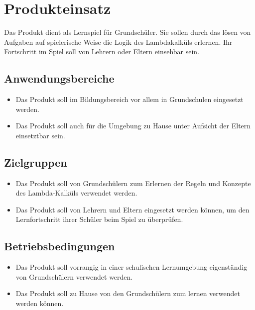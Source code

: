 \section{Produkteinsatz}

Das Produkt dient als Lernspiel für Grundschüler. Sie sollen durch das lösen von Aufgaben auf spielerische Weise die Logik des Lambdakalküls erlernen. Ihr Fortschritt im Spiel soll von Lehrern oder Eltern einsehbar sein.

\subsection{Anwendungsbereiche}
\begin{itemize}
	\item Das Produkt soll im Bildungsbereich vor allem in Grundschulen eingesetzt werden.
	\item Das Produkt soll auch für die Umgebung zu Hause unter Aufsicht der Eltern einsetztbar sein.
\end{itemize}


\subsection{Zielgruppen}

\begin{itemize}
	\item Das Produkt soll von Grundschülern zum Erlernen der Regeln und Konzepte des Lambda-Kalküls verwendet werden.
	\item Das Produkt soll von Lehrern und Eltern eingesetzt werden können, um den Lernfortschritt ihrer Schüler beim Spiel zu überprüfen. 
\end{itemize}

\subsection{Betriebsbedingungen}
\begin{itemize}
	\item Das Produkt soll vorrangig  in einer schulischen Lernumgebung eigenständig von Grundschülern verwendet werden.
	\item Das Produkt soll  zu Hause von den Grundschülern zum lernen verwendet werden können.
\end{itemize}
